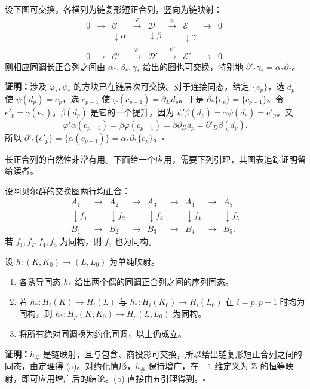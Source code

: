 设下图可交换，各横列为链复形短正合列，竖向为链映射：
\[
\begin{array}{ccccccccc}
0&\to&\mathcal C&\xrightarrow{\varphi}&\mathcal D&\xrightarrow{\psi}&\mathcal E&\to&0\\
&&\downarrow\scriptstyle\alpha&&\downarrow\scriptstyle\beta&&\downarrow\scriptstyle\gamma\\
0&\to&\mathcal C'&\xrightarrow{\varphi'}&\mathcal D'&\xrightarrow{\psi'}&\mathcal E'&\to&0.
\end{array}
\]
则相应同调长正合列之间由 $\alpha_*,\beta_*,\gamma_*$ 给出的图也可交换，特别地 $\partial'_*\gamma_*=\alpha_*\partial_*$。

\noindent\textbf{证明：}涉及 $\varphi_*,\psi_*$ 的方块已在链层次可交换。对于连接同态，给定 $\{e_p\}$，选 $d_p$ 使 $\psi(d_p)=e_p$，选 $c_{p-1}$ 使 $\varphi(c_{p-1})=\partial_Dd_p$。于是 $\partial_*\{e_p\}=\{c_{p-1}\}$。令 $e'_p=\gamma(e_p)$。$\beta(d_p)$ 是它的一个提升，因为 $\psi'\beta(d_p)=\gamma\psi(d_p)=e'_p$。又
\[
\varphi'\alpha(c_{p-1})=\beta\varphi(c_{p-1})
=\beta\partial_Dd_p=\partial'_D\beta(d_p).
\]
所以 $\partial'_*\{e'_p\}=\{\alpha(c_{p-1})\}=\alpha_*\partial_*\{e_p\}$。\hfill$\square$

长正合列的自然性非常有用。下面给一个应用，需要下列引理，其图表追踪证明留给读者。

设阿贝尔群的交换图两行均正合：
\[
\begin{array}{ccccccccc}
A_1&\to&A_2&\to&A_3&\to&A_4&\to&A_5\\
\downarrow\scriptstyle f_1&&\downarrow\scriptstyle f_2&&\downarrow\scriptstyle f_3&&\downarrow\scriptstyle f_4&&\downarrow\scriptstyle f_5\\
B_1&\to&B_2&\to&B_3&\to&B_4&\to&B_5.
\end{array}
\]
若 $f_1,f_2,f_4,f_5$ 为同构，则 $f_3$ 也为同构。

设 $h:(K,K_0)\to(L,L_0)$ 为单纯映射。
\begin{enumerate}[label=(\alph*)]
\item 各诱导同态 $h_*$ 给出两个偶的同调正合列之间的序列同态。
\item 若 $h_*:H_i(K)\to H_i(L)$ 与 $h_*:H_i(K_0)\to H_i(L_0)$ 在 $i=p,p-1$ 时均为同构，则 $h_*:H_p(K,K_0)\to H_p(L,L_0)$ 为同构。
\item 将所有绝对同调换为约化同调，以上仍成立。
\end{enumerate}
\noindent\textbf{证明：}$h_\#$ 是链映射，且与包含、商投影可交换，所以给出链复形短正合列之间的同态，由定理得 (a)。对约化情形，$h_\#$ 保持增广，在 $-1$ 维定义为 $\mathbb{Z}$ 的恒等映射，即可应用增广后的结论。(b) 直接由五引理得到。\hfill$\square$

